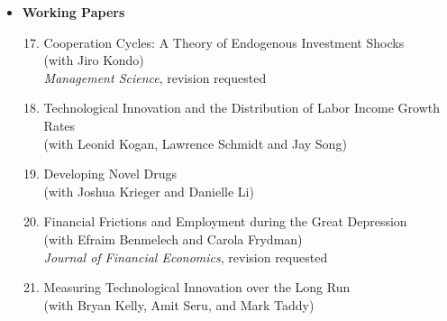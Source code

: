 \documentclass[12pt,letterpaper,serif,overlapped]{res}
\begin{document}
\begin{resume}
\begin{itemize}
\vspace{0.65cm}
\item \textbf{Working Papers}
\begin{enumerate}
\setcounter{enumi}{16}
\item Cooperation Cycles: A Theory of Endogenous Investment Shocks\\ (with Jiro Kondo)\\\emph{Management Science}, revision requested
\item Technological Innovation and the Distribution of Labor Income Growth Rates\\ (with Leonid Kogan, Lawrence Schmidt and Jay Song)
\item Developing Novel Drugs\\(with Joshua Krieger and Danielle Li)
\item Financial Frictions and Employment during the Great Depression\\ (with Efraim Benmelech and Carola Frydman)\\\emph{Journal of Financial Economics}, revision requested
\item Measuring Technological Innovation over the Long Run\\ (with Bryan Kelly, Amit Seru, and Mark Taddy)
\end{enumerate}

%

\vspace{0.5cm}


\end{itemize}
\end{resume}
\end{document}
